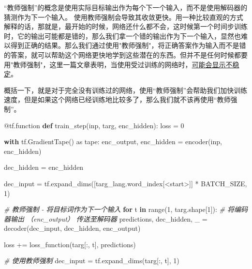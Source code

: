 \documentclass[
]{article}
\newenvironment{Shaded}{}{}
\newcommand{\AttributeTok}[1]{\textcolor[rgb]{0.49,0.56,0.16}{#1}}
\newcommand{\BuiltInTok}[1]{#1}
\newcommand{\CommentTok}[1]{\textcolor[rgb]{0.38,0.63,0.69}{\textit{#1}}}
\newcommand{\ControlFlowTok}[1]{\textcolor[rgb]{0.00,0.44,0.13}{\textbf{#1}}}
\newcommand{\DecValTok}[1]{\textcolor[rgb]{0.25,0.63,0.44}{#1}}
\newcommand{\ImportTok}[1]{#1}
\newcommand{\KeywordTok}[1]{\textcolor[rgb]{0.00,0.44,0.13}{\textbf{#1}}}
\newcommand{\NormalTok}[1]{#1}
\newcommand{\OperatorTok}[1]{\textcolor[rgb]{0.40,0.40,0.40}{#1}}
\newcommand{\StringTok}[1]{\textcolor[rgb]{0.25,0.44,0.63}{#1}}
\begin{document}
``教师强制''的概念是使用实际目标输出作为每个下一个输入，而不是使用解码器的猜测作为下一个输入。
使用教师强制会导致其收敛更快。用一种比较直观的方式解释的话，那就是，最开始的时候，网络还什么都不会，这时候第一个时间步训练时，它的输出可能都是错的，那么我们拿一个错的输出作为下一个输入，显然也难以得到正确的结果。那么我们通过使用"教师强制"，将正确答案作为输入而不是错的答案，就可以帮助这个网络更快地学到这些潜在的东西。但并不是任何时候都要用"教师强制"，这里一篇文章表明，当使用受过训练的网络时，\href{http://citeseerx.ist.psu.edu/viewdoc/download?doi=10.1.1.378.4095\&rep=rep1\&type=pdf}{可能会显示不稳定}。

概括一下，就是对于完全没有训练过的网络，使用``教师强制''会帮助我们加快训练速度，但是如果这个网络已经训练地比较多了，那么我们就不该再使用``教师强制''。

\begin{Shaded}
\begin{Highlighting}[]

\AttributeTok{@tf.function}
\KeywordTok{def}\NormalTok{ train\_step(inp, targ, enc\_hidden):}
\NormalTok{    loss }\OperatorTok{=} \DecValTok{0}

    \ControlFlowTok{with}\NormalTok{ tf.GradientTape() }\ImportTok{as}\NormalTok{ tape:}
\NormalTok{        enc\_output, enc\_hidden }\OperatorTok{=}\NormalTok{ encoder(inp, enc\_hidden)}

\NormalTok{        dec\_hidden }\OperatorTok{=}\NormalTok{ enc\_hidden}

\NormalTok{        dec\_input }\OperatorTok{=}\NormalTok{ tf.expand\_dims([targ\_lang.word\_index[}\StringTok{\textquotesingle{}\textless{}start\textgreater{}\textquotesingle{}}\NormalTok{]] }\OperatorTok{*}\NormalTok{ BATCH\_SIZE, }\DecValTok{1}\NormalTok{)}

        \CommentTok{\# 教师强制 {-} 将目标词作为下一个输入}
        \ControlFlowTok{for}\NormalTok{ t }\KeywordTok{in} \BuiltInTok{range}\NormalTok{(}\DecValTok{1}\NormalTok{, targ.shape[}\DecValTok{1}\NormalTok{]):}
          \CommentTok{\# 将编码器输出 （enc\_output） 传送至解码器}
\NormalTok{            predictions, dec\_hidden, \_ }\OperatorTok{=}\NormalTok{ decoder(dec\_input, dec\_hidden, enc\_output)}

\NormalTok{            loss }\OperatorTok{+=}\NormalTok{ loss\_function(targ[:, t], predictions)}

            \CommentTok{\# 使用教师强制}
\NormalTok{            dec\_input }\OperatorTok{=}\NormalTok{ tf.expand\_dims(targ[:, t], }\DecValTok{1}\NormalTok{)}


\end{Highlighting}
\end{Shaded}
\end{document}
